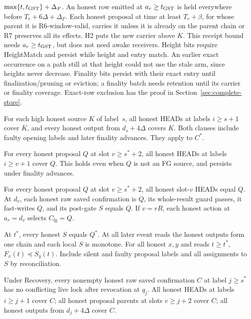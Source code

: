 \documentclass{article}
\theoremstyle{plain}
\theoremstyle{definition}
\theoremstyle{remark}
\newcommand{\Cfg}{C_{\mathrm{fg}}}
\begin{document}
\begin{description}[leftmargin=1.5em]
  $\max\{t,t_{\rm GST}\}+\Delta_F$.
  An honest row emitted at $a_r\geq t_{\rm GST}$
  is held everywhere before $T_r+6\Delta+\Delta_F$.  Each honest proposal
  at time at least $T_r+\beta$, for whose parent it is R6-window-valid, carries it
  unless it is already on the parent chain or R7 preserves all its effects.
  H2 puts the new carrier
  above $K$.  This receipt bound needs $a_r\geq t_{\rm GST}$, but
  does not need awake receivers.  Height bits require HeightMatch and persist while height and
  entry match. An earlier exact occurrence on a path still at that height
  could not use the stale arm, since heights never decrease. Finality
  bits persist with their exact entry until finalization/pruning or eviction;
  a finality batch needs retention until its carrier or finality coverage.
  Exact-row exclusion has the proof in Section~\ref{sec:complete-store}.
\item[H2.A: source support and output transfer.]  For each high
  honest source $K$ of label~$s$, all honest HEADs at labels
  $i\geq s+1$ cover $K$, and every honest output from $d_s+4\Delta$
  covers $K$.  Both clauses include faulty opening labels and later
  finality advances.  They apply to $C^*$.
\item[H2$'$: honest-proposal HEAD coverage.]  For every honest proposal
  $Q$ at slot $v\geq s^*+2$, all honest HEADs at labels $i\geq v+1$
  cover $Q$.  This holds even when $Q$ is not an FG source, and
  persists under finality advances.
\item[H3: exact service.]  For every honest proposal $Q$ at slot
  $v\geq s^*+2$, all honest slot-$v$ HEADs equal $Q$.  At $d_v$, each
  honest raw saved confirmation is $Q$, its whole-result guard passes,
  it fast-writes $Q$, and its post-gate $S$ equals $Q$.
  If $v=rR$, each honest action at $a_r=d_v$ selects $\Cfg=Q$.
\item[H4: output history.]  At $t^*$, every honest $S$ equals $Q^*$.
  At all later event reads the honest outputs form one chain and each
  local $S$ is monotone.  For all honest $x,y$ and reads $t\geq t^*$,
  $F_x(t)\preceq S_y(t)$.  Include silent and faulty proposal labels
  and all assignments to $S$ by reconciliation.
\item[H5: raw-result transfer.]  Under Recovery, every nonempty honest raw saved confirmation $C$
  at label $j\geq s^*$ has no conflicting live lock after revocation
  at $q_j$.  All honest HEADs at labels $i\geq j+1$ cover $C$;
  all honest proposal parents at slots $v\geq j+2$ cover $C$;
  all honest outputs from $d_j+4\Delta$ cover $C$.

\end{description}
\end{document}
